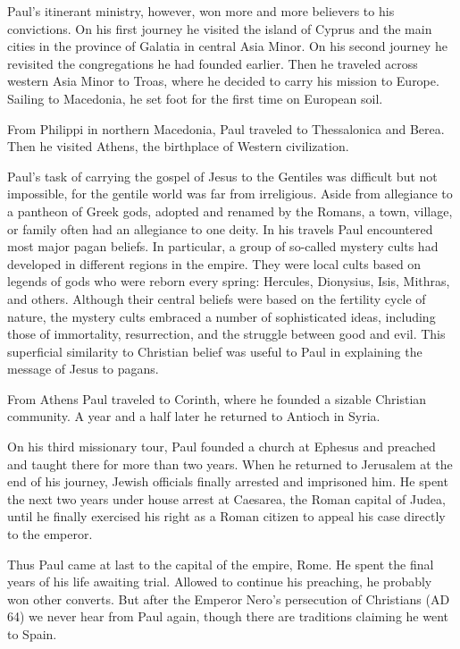 Paul’s itinerant ministry, however, won more and more believers to his convictions. On his first
journey he visited the island of Cyprus and the main cities in the province of Galatia in central
Asia Minor. On his second journey he revisited the congregations he had founded earlier. Then he
traveled across western Asia Minor to Troas, where he decided to carry his mission to Europe.
Sailing to Macedonia, he set foot for the first time on European soil.

From Philippi in northern Macedonia, Paul traveled to Thessalonica and Berea. Then he visited
Athens, the birthplace of Western civilization.

Paul’s task of carrying the gospel of Jesus to the Gentiles was difficult but not impossible, for
the gentile world was far from irreligious. Aside from allegiance to a pantheon of Greek gods,
adopted and renamed by the Romans, a town, village, or family often had an allegiance to one deity.
In his travels Paul encountered most major pagan beliefs. In particular, a group of so-called
mystery cults had developed in different regions in the empire. They were local cults based on
legends of gods who were reborn every spring: Hercules, Dionysius, Isis, Mithras, and others.
Although their central beliefs were based on the fertility cycle of nature, the mystery cults
embraced a number of sophisticated ideas, including those of immortality, resurrection, and the
struggle between good and evil. This superficial similarity to Christian belief was useful to Paul
in explaining the message of Jesus to pagans.

From Athens Paul traveled to Corinth, where he founded a sizable Christian community. A year and a
half later he returned to Antioch in Syria.

On his third missionary tour, Paul founded a church at Ephesus and preached and taught there for
more than two years. When he returned to Jerusalem at the end of his journey, Jewish officials
finally arrested and imprisoned him. He spent the next two years under house arrest at Caesarea, the
Roman capital of Judea, until he finally exercised his right as a Roman citizen to appeal his case
directly to the emperor.

Thus Paul came at last to the capital of the empire, Rome. He spent the final years of his life
awaiting trial. Allowed to continue his preaching, he probably won other converts. But after the
Emperor Nero’s persecution of Christians (AD 64) we never hear from Paul again, though there are
traditions claiming he went to Spain.


